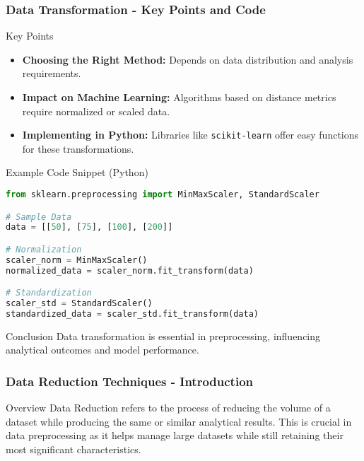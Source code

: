 \documentclass[aspectratio=169]{beamer}
\begin{document}
\begin{frame}[fragile]
    \frametitle{Data Transformation - Key Points and Code}
    \begin{block}{Key Points}
        \begin{itemize}
            \item \textbf{Choosing the Right Method:} Depends on data distribution and analysis requirements.
            \item \textbf{Impact on Machine Learning:} Algorithms based on distance metrics require normalized or scaled data.
            \item \textbf{Implementing in Python:} Libraries like \texttt{scikit-learn} offer easy functions for these transformations.
        \end{itemize}
    \end{block}
    
    \begin{block}{Example Code Snippet (Python)}
    \begin{lstlisting}[language=Python]
from sklearn.preprocessing import MinMaxScaler, StandardScaler

# Sample Data
data = [[50], [75], [100], [200]]

# Normalization
scaler_norm = MinMaxScaler()
normalized_data = scaler_norm.fit_transform(data)

# Standardization
scaler_std = StandardScaler()
standardized_data = scaler_std.fit_transform(data)
    \end{lstlisting}
    \end{block}
    
    \begin{block}{Conclusion}
        Data transformation is essential in preprocessing, influencing analytical outcomes and model performance.
    \end{block}
\end{frame}

\begin{frame}[fragile]
    \frametitle{Data Reduction Techniques - Introduction}
    \begin{block}{Overview}
        Data Reduction refers to the process of reducing the volume of a dataset while producing the same or similar analytical results. This is crucial in data preprocessing as it helps manage large datasets while still retaining their most significant characteristics.
    \end{block}
\end{frame}
\end{document}
